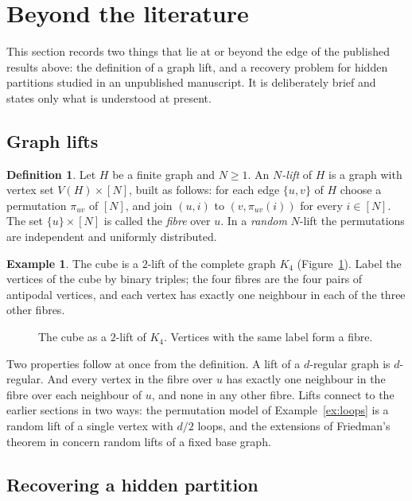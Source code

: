 \documentclass[11pt,letterpaper]{article}
\theoremstyle{definition}
\newtheorem{example}[theorem]{Example}
\newtheorem{definition}[theorem]{Definition}
\theoremstyle{remark}
\begin{document}
\section{Beyond the literature}

This section records two things that lie at or beyond the edge of the published results above:
the definition of a graph lift, and a recovery problem for hidden partitions studied in an
unpublished manuscript. It is deliberately brief and states only what is understood at present.

\subsection{Graph lifts}

\begin{definition}
Let $H$ be a finite graph and $N\ge1$. An \emph{$N$-lift} of $H$ is a graph with vertex set
$V(H)\times[N]$, built as follows: for each edge $\{u,v\}$ of $H$ choose a permutation $\pi_{uv}$
of $[N]$, and join $(u,i)$ to $(v,\pi_{uv}(i))$ for every $i\in[N]$. The set $\{u\}\times[N]$ is
called the \emph{fibre} over $u$. In a \emph{random} $N$-lift the permutations are independent
and uniformly distributed.
\end{definition}

\begin{example}
The cube is a $2$-lift of the complete graph $K_4$ (Figure~\ref{fig:lift}). Label the vertices of
the cube by binary triples; the four fibres are the four pairs of antipodal vertices, and each
vertex has exactly one neighbour in each of the three other fibres.
\end{example}

\begin{figure}[ht]
  \centering
  
  \caption{The cube as a $2$-lift of $K_4$. Vertices with the same label form a fibre.}
  \label{fig:lift}
\end{figure}

Two properties follow at once from the definition. A lift of a $d$-regular graph is $d$-regular.
And every vertex in the fibre over $u$ has exactly one neighbour in the fibre over each neighbour
of $u$, and none in any other fibre. Lifts connect to the earlier sections in two ways: the
permutation model of Example~\ref{ex:loops} is a random lift of a single vertex with $d/2$ loops,
and the extensions of Friedman's theorem in \cite{FK,B} concern random lifts of a fixed base
graph.

\subsection{Recovering a hidden partition}
\end{document}
